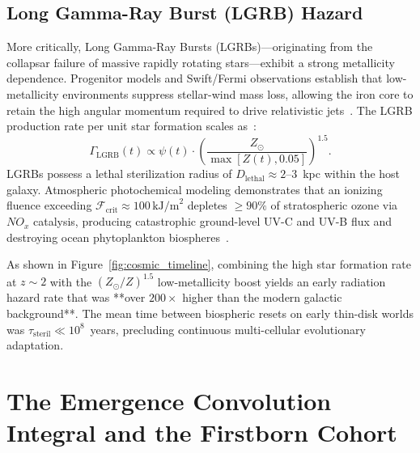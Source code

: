 \documentclass[11pt,a4paper]{article}
\begin{document}
\subsection{Long Gamma-Ray Burst (LGRB) Hazard}

More critically, Long Gamma-Ray Bursts (LGRBs)—originating from the collapsar failure of massive rapidly rotating stars—exhibit a strong metallicity dependence. Progenitor models and Swift/Fermi observations establish that low-metallicity environments suppress stellar-wind mass loss, allowing the iron core to retain the high angular momentum required to drive relativistic jets~\cite{stanek2006,modjaz2008}. The LGRB production rate per unit star formation scales as~\cite{piran2014}:
\begin{equation}
\Gamma_{\mathrm{LGRB}}(t) \propto \psi(t) \cdot \left( \frac{Z_\odot}{\max[Z(t), 0.05]} \right)^{1.5}.
\label{eq:lgrb}
\end{equation}
LGRBs possess a lethal sterilization radius of $D_{\mathrm{lethal}} \approx 2\text{--}3$~kpc within the host galaxy. Atmospheric photochemical modeling demonstrates that an ionizing fluence exceeding $\mathcal{F}_{\mathrm{crit}} \approx 100\,\mathrm{kJ/m}^2$ depletes $\ge 90\%$ of stratospheric ozone via $NO_x$ catalysis, producing catastrophic ground-level UV-C and UV-B flux and destroying ocean phytoplankton biospheres~\cite{thomas2005}.

As shown in Figure~\ref{fig:cosmic_timeline}, combining the high star formation rate at $z \sim 2$ with the $(Z_\odot/Z)^{1.5}$ low-metallicity boost yields an early radiation hazard rate that was **over $200\times$ higher than the modern galactic background**. The mean time between biospheric resets on early thin-disk worlds was $\tau_{\mathrm{steril}} \ll 10^8$~years, precluding continuous multi-cellular evolutionary adaptation.



\section{The Emergence Convolution Integral and the Firstborn Cohort}
\label{sec:convolution}
\end{document}
